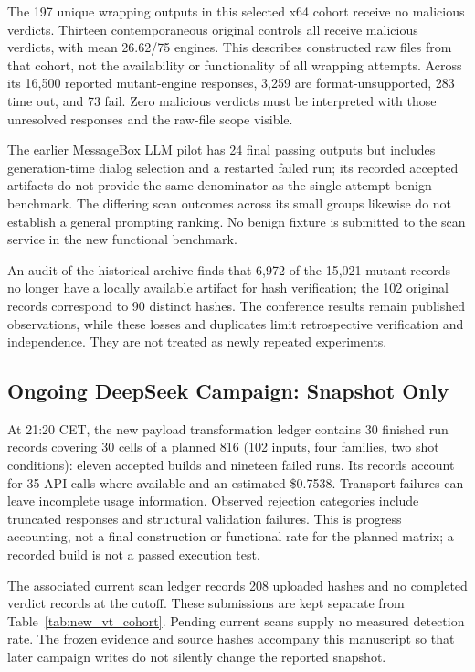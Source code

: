 The 197 unique wrapping outputs in this selected x64 cohort receive
no malicious verdicts. Thirteen contemporaneous original controls
all receive malicious verdicts, with mean 26.62/75 engines. This
describes constructed raw files from that cohort, not the availability
or functionality of all wrapping attempts. Across its 16,500 reported
mutant-engine responses, 3,259 are format-unsupported, 283 time out,
and 73 fail. Zero malicious verdicts must be interpreted with those
unresolved responses and the raw-file scope visible.

The earlier MessageBox LLM pilot has 24 final passing outputs but
includes generation-time dialog selection and a restarted failed run;
its recorded accepted artifacts do not provide the same denominator
as the single-attempt benign benchmark. The differing scan outcomes
across its small groups likewise do not establish a general prompting
ranking. No benign fixture is submitted to the scan service in the
new functional benchmark.

An audit of the historical archive finds that 6,972 of the 15,021
mutant records no longer have a locally available artifact for hash
verification; the 102 original records correspond to 90 distinct
hashes. The conference results remain published observations, while
these losses and duplicates limit retrospective verification and
independence. They are not treated as newly repeated experiments.

\subsection{Ongoing DeepSeek Campaign: Snapshot Only}
At 21:20 CET, the new payload transformation ledger contains
30 finished run records covering 30 cells of a planned 816
(102 inputs, four families, two shot conditions): eleven accepted
builds and nineteen failed runs. Its records account for 35 API calls where available and
an estimated \$0.7538. Transport failures can leave incomplete
usage information. Observed rejection categories include truncated
responses and structural validation failures. This is progress
accounting, not a final construction or functional rate for the
planned matrix; a recorded build is not a passed execution test.

The associated current scan ledger records 208 uploaded hashes and
no completed verdict records at the cutoff. These submissions are
kept separate from Table~\ref{tab:new_vt_cohort}. Pending current
scans supply no measured detection rate. The frozen evidence and
source hashes accompany this manuscript so that later campaign
writes do not silently change the reported snapshot.
